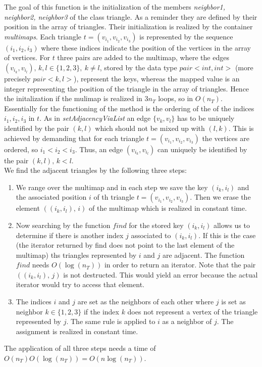 \documentclass[10pt]{article}
\begin{document}
The goal of this function is the initialization of the members {\itshape neighbor1, neighbor2, neighbor3} of the class triangle. As a reminder they are defined by their position in the array of triangles. Their initialization is realized by the container {\itshape multimaps}. 
Each triangle $ t = (v_{i_1},v_{i_2},v_{i_3}) $ is represented by the sequence $ (i_1,i_2,i_3) $ where these indices indicate the position of the vertices in the array of vertices. 
For $ t $ three pairs are added to the multimap, where the edges $(v_{i_k},v_{i_l}), \, k,l \in \{1,2,3\}, \ k \neq l $, stored by the data type $ pair<int,int> $ (more precisely $ pair<k,l> $), represent the keys, whereas the mapped value is an integer representing the position of the triangle in the array of triangles. Hence the initalization if the mulimap is realized in $ 3n_T $ loops, so in $ O(n_T) $. \\
Essentially for the functioning of the method is the ordering of the of the indices $ i_1,i_2,i_3 $ in $ t $. As in {\itshape setAdjacencyViaList} an edge $ \{ v_k, v_l\} $
 has to be uniquely identified by the pair $ (k,l) $ which should not be mixed up with $(l,k) $. This is achieved by demanding that for each triangle $ t =  (v_{i_1},v_{i_2},v_{i_3})$ the vertices are ordered, so $ i_1 < i_2 < i_3 $. Thus, an edge $(v_{i_k},v_{i_l}) $ can uniquely be identified by the pair $ (k,l), \, k < l $. \\
 We find the adjacent triangles by the following three steps: 
 \begin{enumerate}
 	\item 
 	We range over the multimap and in each step we save the key $ (i_k,i_l) $ and the associated position $ i $ of th triangle $ t = (v_{i_1},v_{i_2},v_{i_3})  $. Then we erase the element $ ( (i_k,i_l), \, i) $ of the multimap which is realized in constant time. 
 	\item 
 	Now searching by the function $ find $ for the stored key $ (i_k,i_l) $ allows us to determine if there is another index $ j $ associated to $ (i_k,i_l) $. If this is the case (the iterator returned by find does not point to the last element of the multimap) ths triangles represented by $i$ and $j$ are adjacent. The function  $ find $ needs $ O(\log(n_T)) $ in order to return an iterator. 
 	Note that the pair $ ( (i_k,i_l), \, j) $ is not destructed. This would yield an error because the actual iterator would try to access that element. 
 	\item 
 	The indices $ i $ and $ j $ are set as the neighbors of each other where $ j $ is set as neighbor $ k \in \{1,2,3\} $ if the index $k$ does not represent a vertex of the triangle represented by $ j $. The same rule is applied to $ i $ as a neighbor of $ j $. 
 	The assignment is realized in constant time. 
  \end{enumerate}
The application of all three steps needs a time of $ O(n_T)O(\log(n_T)) = O(n\log(n_T)) $. 
\end{document}
